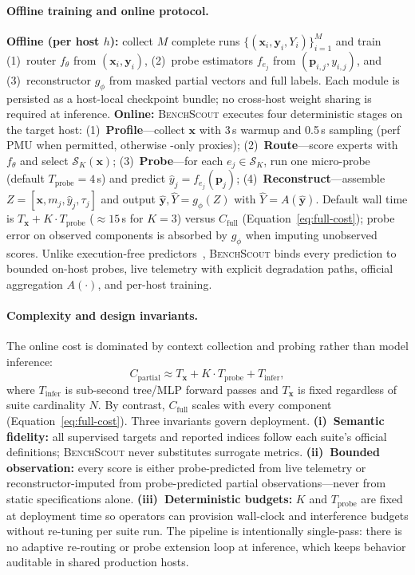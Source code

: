 \documentclass[sigplan,10pt]{acmart}
\newcommand{\ourmethod}{\textsc{BenchScout}\xspace}
\begin{document}
\paragraph{Offline training and online protocol.}
\textbf{Offline (per host $h$):} collect $M$ complete runs $\{(\mathbf{x}_i,\mathbf{y}_i,Y_i)\}_{i=1}^M$ and train (1)~router $f_\theta$ from $(\mathbf{x}_i,\mathbf{y}_i)$, (2)~probe estimators $f_{e_j}$ from $(\mathbf{p}_{i,j},y_{i,j})$, and (3)~reconstructor $g_\phi$ from masked partial vectors and full labels.
Each module is persisted as a host-local checkpoint bundle; no cross-host weight sharing is required at inference.
\textbf{Online:} \ourmethod executes four deterministic stages on the target host:
(1)~\textbf{Profile}---collect $\mathbf{x}$ with 3\,s warmup and 0.5\,s  sampling (perf PMU when permitted, otherwise -only proxies);
(2)~\textbf{Route}---score experts with $f_\theta$ and select $\mathcal{S}_K(\mathbf{x})$;
(3)~\textbf{Probe}---for each $e_j\in\mathcal{S}_K$, run one micro-probe (default $T_{\mathrm{probe}}{=}4$\,s) and predict $\hat{y}_j=f_{e_j}(\mathbf{p}_j)$;
(4)~\textbf{Reconstruct}---assemble $Z=[\mathbf{x},m_j,\hat{y}_j,\tau_j]$ and output $\hat{\mathbf{y}},\hat{Y}=g_\phi(Z)$ with $\hat{Y}=A(\hat{\mathbf{y}})$.
Default wall time is $T_{\mathbf{x}}+K{\cdot}T_{\mathrm{probe}}$ (${\approx}15$\,s for $K{=}3$) versus $C_{\mathrm{full}}$ (Equation~\ref{eq:full-cost}); probe error on observed components is absorbed by $g_\phi$ when imputing unobserved scores.
Unlike execution-free predictors~\cite{wang2019predicting,tousi2022comparative}, \ourmethod binds every prediction to bounded on-host probes, live telemetry with explicit degradation paths, official aggregation $A(\cdot)$, and per-host training.

\paragraph{Complexity and design invariants.}
The online cost is dominated by context collection and probing rather than model inference:
\begin{equation}
\label{eq:partial-cost}
C_{\mathrm{partial}} \approx T_{\mathbf{x}} + K \cdot T_{\mathrm{probe}} + T_{\mathrm{infer}},
\end{equation}
where $T_{\mathrm{infer}}$ is sub-second tree/MLP forward passes and $T_{\mathbf{x}}$ is fixed regardless of suite cardinality $N$.
By contrast, $C_{\mathrm{full}}$ scales with every component (Equation~\ref{eq:full-cost}).
Three invariants govern deployment.
\textbf{(i)~Semantic fidelity:} all supervised targets and reported indices follow each suite's official definitions; \ourmethod never substitutes surrogate metrics.
\textbf{(ii)~Bounded observation:} every score is either probe-predicted from live telemetry or reconstructor-imputed from probe-predicted partial observations---never from static specifications alone.
\textbf{(iii)~Deterministic budgets:} $K$ and $T_{\mathrm{probe}}$ are fixed at deployment time so operators can provision wall-clock and interference budgets without re-tuning per suite run.
The pipeline is intentionally single-pass: there is no adaptive re-routing or probe extension loop at inference, which keeps behavior auditable in shared production hosts.
\end{document}
